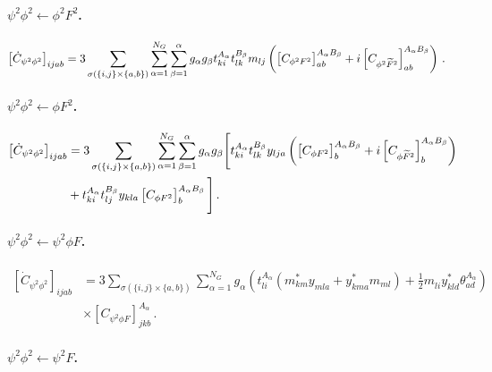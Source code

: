 \paragraph{\texorpdfstring{$\psi^2 \phi^2 \leftarrow \phi^2 F^2$.}{psi2phi2fromphi2F2}}

\begin{align}
    \left[\dot C_{\psi^2\phi^2}\right]_{ijab} &= 3\sum_{\sigma(\{i,j\}\times\{a,b\})} \sum_{\alpha=1}^{N_G}\sum_{\beta=1}^{\alpha} g_\alpha g_\beta t^{A_\alpha}_{ki} t^{B_\beta}_{lk} m_{lj} \left(\left[C_{\phi^2 F^2}\right]_{ab}^{A_\alpha B_\beta}+i\left[C_{\phi^2 \widetilde{F}^2}\right]_{ab}^{A_\alpha B_\beta} \right) \,.
    \label{psi2phi2_phi2F2}
\end{align}

\paragraph{\texorpdfstring{$\psi^2 \phi^2 \leftarrow \phi F^2$.}{psi2phi2fromphiF2}}

\begin{align}
    \left[\dot C_{\psi^2\phi^2}\right]_{ijab} &= 3\sum_{\sigma(\{i,j\}\times\{a,b\})} \sum_{\alpha=1}^{N_G}\sum_{\beta=1}^{\alpha} g_\alpha g_\beta\Bigg[ t^{A_\alpha}_{ki} t^{B_\beta}_{lk} y_{lja} \left(\left[C_{\phi F^2}\right]_{b}^{A_\alpha B_\beta}+i\left[C_{\phi \widetilde{F}^2}\right]_{b}^{A_\alpha B_\beta} \right)\nonumber\\
    &+t_{ki}^{A_\alpha} t_{lj}^{B_\beta} y_{kla}\left[C_{\phi F^2}\right]^{A_\alpha B_\beta}_b\Bigg]\,.
    \label{psi2phi2_phiF2}
\end{align}

\paragraph{\texorpdfstring{$\psi^2 \phi^2 \leftarrow \psi^2 \phi F$.}{psi2phi2fromphi2phiF}}

\begin{align}
    \left[\dot C_{\psi^2\phi^2}\right]_{ijab} &= 3\sum_{\sigma(\{i,j\}\times\{a,b\})} \sum_{\alpha=1}^{N_G} g_\alpha \left(t^{A_\alpha}_{li}\left(m_{km}^{*} y_{mla}+y_{kma}^{*} m_{ml}\right) 
    + \frac{1}{2}m_{li}^{\phantom *} y_{kld}^* \theta^{A_\alpha}_{ad}\right)\nonumber \\&\times\left[C_{\psi^2\phi F}\right]_{jkb}^{A_\alpha}\,.\label{psi2phi2_psi2phiF}
\end{align}


\paragraph{\texorpdfstring{$\psi^2 \phi^2 \leftarrow \psi^2 F$.}{psi2phi2fromphi2F}}

